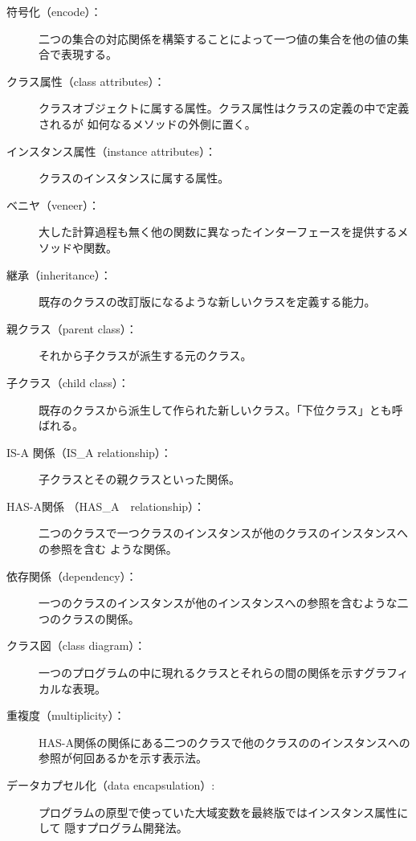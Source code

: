 \documentclass[a4j,12pt,makeidx]{jbook}
\begin{document}
\begin{description}

\item[符号化（encode）：] 二つの集合の対応関係を構築することによって一つ値の集合を他の値の集合で表現する。

\item[クラス属性（class attributes）：] クラスオブジェクトに属する属性。クラス属性はクラスの定義の中で定義されるが
如何なるメソッドの外側に置く。

\item[インスタンス属性（instance attributes）：] クラスのインスタンスに属する属性。

\item[ベニヤ（veneer）：] 大した計算過程も無く他の関数に異なったインターフェースを提供するメソッドや関数。

\item[継承（inheritance）：] 既存のクラスの改訂版になるような新しいクラスを定義する能力。

\item[親クラス（parent class）：] それから子クラスが派生する元のクラス。

\item[子クラス（child class）：] 既存のクラスから派生して作られた新しいクラス。「下位クラス」とも呼ばれる。

\item[IS-A 関係（IS\_A relationship）：] 子クラスとその親クラスといった関係。

\item[HAS-A関係 （HAS\_A　relationship）：] 二つのクラスで一つクラスのインスタンスが他のクラスのインスタンスへの参照を含む
ような関係。

\item[依存関係（dependency）：] 一つのクラスのインスタンスが他のインスタンスへの参照を含むような二つのクラスの関係。

\item[クラス図（class diagram）：] 一つのプログラムの中に現れるクラスとそれらの間の関係を示すグラフィカルな表現。

\item[重複度（multiplicity）：] HAS-A関係の関係にある二つのクラスで他のクラスののインスタンスへの参照が何回あるかを示す表示法。

\item[データカプセル化（data encapsulation）:] プログラムの原型で使っていた大域変数を最終版ではインスタンス属性にして
隠すプログラム開発法。

\end{description}
%
\end{document}
